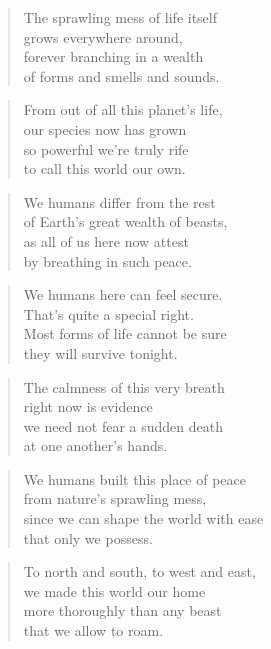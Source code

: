 \documentclass[10pt,a4paper]{article}
\begin{document}
\begin{multicols}{2}
\begin{verse}
The sprawling mess of life itself\\
grows everywhere around,\\
forever branching in a wealth\\
of forms and smells and sounds.
\end{verse}

\begin{verse}
From out of all this planet’s life,\\
our species now has grown\\
so powerful we’re truly rife\\
to call this world our own.
\end{verse}

\begin{verse}
We humans differ from the rest\\
of Earth’s great wealth of beasts,\\
as all of us here now attest\\
by breathing in such peace.
\end{verse}

\begin{verse}
We humans here can feel secure.\\
That’s quite a special right.\\
Most forms of life cannot be sure\\
they will survive tonight.
\end{verse}

\begin{verse}
The calmness of this very breath\\
right now is evidence\\
we need not fear a sudden death\\
at one another’s hands.
\end{verse}

\begin{verse}
We humans built this place of peace\\
from nature’s sprawling mess,\\
since we can shape the world with ease\\
that only we possess.
\end{verse}

\begin{verse}
To north and south, to west and east,\\
we made this world our home\\
more thoroughly than any beast\\
that we allow to roam.
\end{verse}


\end{multicols}
\end{document}
